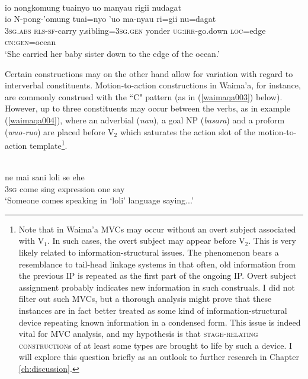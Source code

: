 \ea \label{}
\\
\glll io nongkomung tuainyo uo manyau rigii nudagat \\
io N-pong-'omung tuai=nyo 'uo ma-nyau ri=gii nu=dagat \\
3\textsc{sg}.\textsc{abs} \textsc{rls}-\textsc{sf}-carry y.sibling=3\textsc{sg}.\textsc{gen} yonder \textsc{ug}:\textsc{irr}-go.down \textsc{loc}=edge \textsc{cn}:\textsc{gen}=ocean \\
\glft `She carried her baby sister down to the edge of the ocean.'\\
\z

Certain constructions may on the other hand allow for variation with regard to interverbal constituents. Motion-to-action constructions in Waima'a, for instance, are commonly construed with the ``C" pattern (as in (\ref{waimaqa003}) below). However, up to three constituents may occur between the verbs, as in example (\ref{waimaqa004}), where an adverbial (\textit{nan}), a goal NP (\textit{basara}) and a proform (\textit{wuo-ruo}) are placed before V$_2$ which saturates the action slot of the motion-to-action template\footnote{Note that in Waima'a MVCs may occur without an overt subject associated with V$_1$. In such cases, the overt subject may appear before V$_2$. This is very likely related to information-structural issues. The phenomenon bears a resemblance to tail-head linkage systems in that often, old information from the previous IP is repeated as the first part of the ongoing IP. Overt subject assignment probably indicates new information in such construals. I did not filter out such MVCs, but a thorough analysis might prove that these instances are in fact better treated as some kind of information-structural device repeating known information in a condensed form. This issue is indeed vital for MVC analysis, and my hypothesis is that \textsc{stage-relating construction}s of at least some types are brought to life by such a device. I will explore this question briefly as an outlook to further research in Chapter \ref{ch:discussion}.}.

\ea \label{waimaqa003}
\\
\gll ne mai sani loli se ehe \\
3\textsc{sg} come sing expression one say \\
\glft `Someone comes speaking in `loli' language saying...'\\ 
\z

